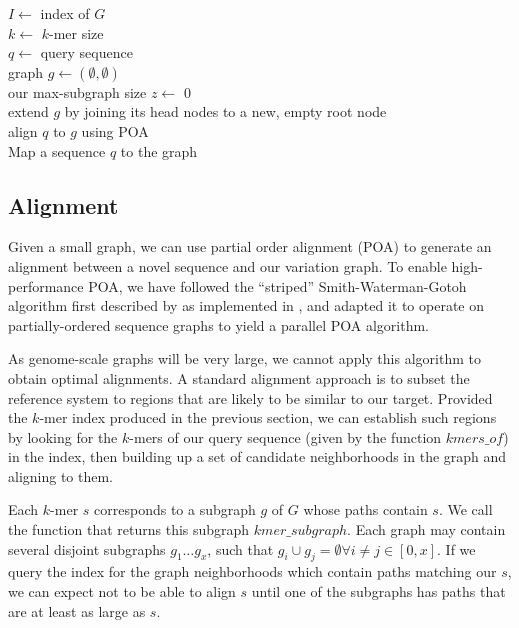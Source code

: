 \documentclass{article}
\begin{document}
\begin{algorithm}[h!]
  $I \gets $ index of $G$ \\
  $k \gets $ $k$-mer size \\
  $q \gets $ query sequence \\
  graph $g \gets ( \emptyset, \emptyset )$ \\
  our max-subgraph size $z \gets $ 0 \\
  extend $g$ by joining its head nodes to a new, empty root node \\
  align $q$ to $g$ using POA \\
  \caption{
    \label{alg:map}
    Map a sequence $q$ to the graph
  }
\end{algorithm}


\subsection{Alignment}

Given a small graph, we can use partial order alignment (POA) \cite{lee2002POA} to generate an alignment between a novel sequence and our variation graph. To enable high-performance POA, we have followed the ``striped'' Smith-Waterman-Gotoh algorithm first described by \cite{farrar2007striped} as implemented in \cite{zhao2013ssw}, and adapted it to operate on partially-ordered sequence graphs to yield a parallel POA algorithm.

As genome-scale graphs will be very large, we cannot apply this algorithm to obtain optimal alignments. A standard alignment approach is to subset the reference system to regions that are likely to be similar to our target. Provided the $k$-mer index produced in the previous section, we can establish such regions by looking for the $k$-mers of our query sequence (given by the function $kmers\_of$) in the index, then building up a set of candidate neighborhoods in the graph and aligning to them.

Each $k$-mer $s$ corresponds to a subgraph $g$ of $G$ whose paths contain $s$. We call the function that returns this subgraph $kmer\_subgraph$. Each graph may contain several disjoint subgraphs $g_1\ldots g_x$, such that $g_i \cup g_j = \emptyset \forall i \ne j \in [0,x]$. If we query the index for the graph neighborhoods which contain paths matching our $s$, we can expect not to be able to align $s$ until one of the subgraphs has paths that are at least as large as $s$.
\end{document}
